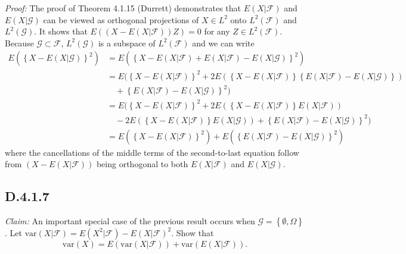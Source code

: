 \documentclass[10pt]{article}
\newcommand{\var}{\text{var}}
\begin{document}
\textit{Proof:} The proof of Theorem 4.1.15 (Durrett) demonstrates that 
$E(X \vert \mathcal{F})$ and $E(X \vert \mathcal{G})$
can be viewed as orthogonal projections of $X \in L^2$
onto $L^2(\mathcal{F})$ and $L^2(\mathcal{G})$.
It shows that $E((X - E(X \vert \mathcal{F}))Z) = 0$ 
for any $Z \in L^2(\mathcal{F})$.
Because $\mathcal{G} \subset \mathcal{F}$,
$L^2(\mathcal{G})$ is a subspace of $L^2(\mathcal{F})$
and we can write
\begin{equation*}
\begin{aligned}
  E(\left\{X - E(X \vert \mathcal{G})\right\}^2)
  & = E(\left\{X - E(X \vert \mathcal{F}) 
  + E(X \vert \mathcal{F}) - E(X \vert \mathcal{G})\right\}^2) \\
  & = E(\left\{X - E(X \vert \mathcal{F}) \right\}^2
  + 2 E(\left\{ X - E(X \vert \mathcal{F})\right\}
  \left\{ E(X \vert \mathcal{F}) - E(X \vert \mathcal{G})\right\}) \\
  & \quad + \left\{ E(X \vert \mathcal{F}) - E(X \vert \mathcal{G})\right\}^2) \\
  & = E(\left\{X - E(X \vert \mathcal{F}) \right\}^2
  + 2 E(\left\{ X - E(X \vert \mathcal{F})\right\}E(X \vert \mathcal{F})) \\
  & \quad - 2 E(\left\{ X - E(X \vert \mathcal{F})\right\}E(X \vert \mathcal{G}))
  + \left\{ E(X \vert \mathcal{F}) - E(X \vert \mathcal{G})\right\}^2) \\
  & = E(\left\{X - E(X \vert \mathcal{F}) \right\}^2)
  + E(\left\{ E(X \vert \mathcal{F}) - E(X \vert \mathcal{G})\right\}^2)
\end{aligned}
\end{equation*}
where the cancellations of the middle terms of the second-to-last equation
follow from 
$(X - E(X \vert \mathcal{F}))$ being orthogonal to both
$E(X \vert \mathcal{F})$ and $E(X \vert \mathcal{G})$.

\subsection*{D.4.1.7}

\textit{Claim:} An important special case of the previous result occurs
when $\mathcal{G} = \left\{\emptyset,\Omega\right\}$.
Let $\var (X \vert \mathcal{F}) 
= E(X^2 \vert \mathcal{F}) - E(X \vert \mathcal{F})^2$.
Show that
\begin{equation*}
  \var(X) = E(\var(X \vert \mathcal{F})) + \var(E(X \vert \mathcal{F})).
\end{equation*}
\end{document}
